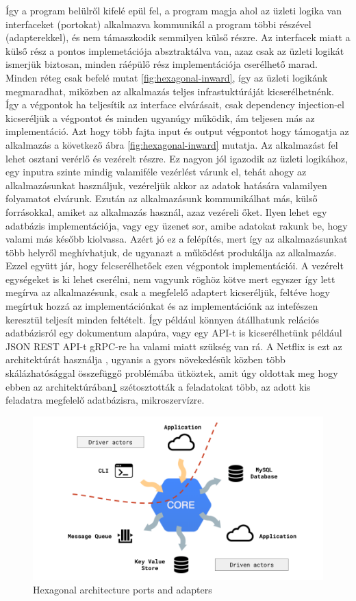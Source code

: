 Így a program belülről kifelé epül fel, a program magja ahol az üzleti logika van interfaceket (portokat) alkalmazva kommunikál a program többi részével (adapterekkel), és nem támaszkodik semmilyen külső részre. Az interfacek miatt a külső rész a pontos implemetációja absztraktálva van, azaz csak az üzleti logikát ismerjük biztosan, minden ráépülő rész implementációja cserélhető marad.
Minden réteg csak befelé mutat \ref{fig:hexagonal-inward}, így az üzleti logikánk megmaradhat, miközben az alkalmazás teljes infrastuktúráját kicserélhetnénk.
Így a végpontok ha teljesítik az interface elvárásait, csak dependency injection-el kicseréljük a végpontot és minden ugyanúgy működik, ám teljesen más az implementáció.
Azt hogy több fajta input és output végpontot hogy  támogatja az alkalmazás a következő ábra \ref{fig:hexagonal-inward} mutatja.
Az alkalmazást fel lehet osztani verérlő és vezérelt részre. Ez nagyon jól igazodik az üzleti logikához, egy inputra szinte mindig valamiféle vezérlést várunk el,
tehát ahogy az alkalmazásunkat használjuk, vezéreljük akkor az adatok hatására valamilyen folyamatot elvárunk. Ezután az alkalmazásunk kommunikálhat más, külső forrásokkal, amiket az alkalmazás használ, azaz vezéreli őket.
Ilyen lehet egy adatbázis implementációja, vagy egy üzenet sor, amibe adatokat rakunk be, hogy valami más később kiolvassa.
Azért jó ez a felépítés, mert így az alkalmazásunkat több helyről meghívhatjuk, de ugyanazt a működést produkálja az alkalmazás. Ezzel együtt jár, hogy felcserélhetőek ezen végpontok implementációi.
A vezérelt egységeket is ki lehet cserélni, nem vagyunk röghöz kötve mert egyszer így lett megírva az alkalmazésunk, csak a megfelelő adaptert kicseréljük, feltéve hogy megírtuk hozzá az implementációnkat és az implementációnk
az intefészen keresztül teljesít minden feltételt. Így például könnyen átállhatunk relációs adatbázisról egy dokumentum alapúra, vagy egy API-t is kicserélhetünk például JSON REST API-t gRPC-re ha valami miatt szükség van rá.
A Netflix is ezt az architektúrát használja \cite{netflix}, ugyanis a gyors növekedésük közben több skálázhatósággal összefüggő problémába ütköztek, amit úgy oldottak meg hogy
ebben az architektúrában\ref{fig:hexagonal-actor} szétosztották a feladatokat több, az adott kis feladatra megfelelő adatbázisra, mikroszervízre.
\begin{figure}[h]
    \centering
    \includegraphics[scale=0.3]{images/hexa-actor.png}
    \caption{Hexagonal architecture ports and adapters}
    \label{fig:hexagonal-actor}
\end{figure}

